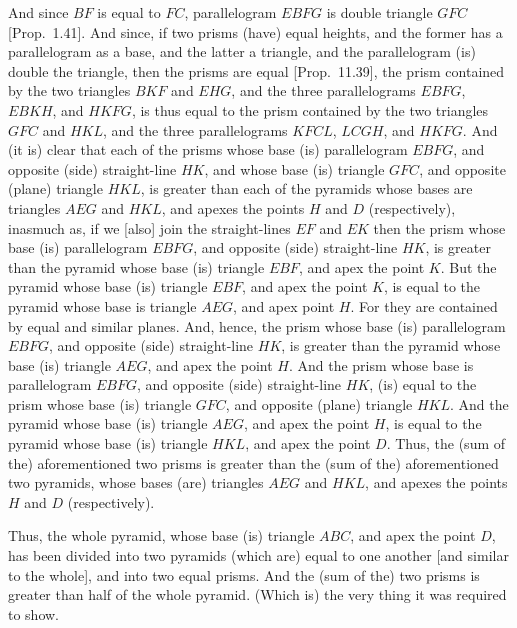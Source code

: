 \begin{Parallel}{}{}
{And since $BF$ is equal to $FC$, parallelogram $EBFG$ is double triangle $GFC$ [Prop.~1.41]. And since, if two prisms (have) 
equal heights, and the former has a parallelogram as a base, and the latter a triangle, and the parallelogram (is) double
the triangle, then the prisms are equal [Prop.~11.39],  the prism
contained by the two triangles $BKF$ and $EHG$, and the three parallelograms $EBFG$,
$EBKH$, and $HKFG$, is thus  equal to the prism contained by the two triangles $GFC$ and
$HKL$, and the three parallelograms $KFCL$, $LCGH$, and $HKFG$. And (it is) clear that
each of the prisms whose base (is) parallelogram $EBFG$, and opposite (side) straight-line
$HK$, and whose base (is) triangle $GFC$, and opposite (plane) triangle $HKL$, is greater than
each of the pyramids whose bases are triangles $AEG$ and $HKL$, and apexes the points
$H$ and $D$ (respectively), inasmuch as, if we [also] join the straight-lines
$EF$ and $EK$ then the prism whose base (is) parallelogram $EBFG$, and opposite
(side) straight-line $HK$, is greater than the pyramid whose base (is) triangle $EBF$,
and apex the point $K$. But the pyramid whose base (is) triangle $EBF$, and apex the point $K$,
is equal to the pyramid whose base is triangle $AEG$, and apex point $H$. For
they are contained by equal and similar planes. And, hence, the prism whose base (is)
parallelogram $EBFG$, and opposite (side) straight-line $HK$, is greater than the pyramid
whose base (is) triangle $AEG$, and apex the  point $H$. And the prism 
whose base is
parallelogram $EBFG$, and opposite (side) straight-line $HK$, (is) equal to the prism
whose base (is) triangle $GFC$, and opposite (plane) triangle $HKL$. And the pyramid whose
base (is) triangle $AEG$, and apex the  point $H$, is equal to the pyramid whose base (is) triangle
$HKL$, and apex the point $D$. Thus, the (sum of the) aforementioned
two prisms is greater than the (sum of the) aforementioned two pyramids, whose bases (are)
triangles $AEG$ and $HKL$, and apexes the points $H$ and $D$ (respectively).

Thus, the whole pyramid, whose base (is) triangle $ABC$, and apex the point $D$, has been
divided into two pyramids (which are) equal to one another [and similar to the whole],
and into two equal prisms. And the (sum of the) two prisms is greater than half of the
whole pyramid. (Which is) the very thing it was required to show.}
\end{Parallel}

